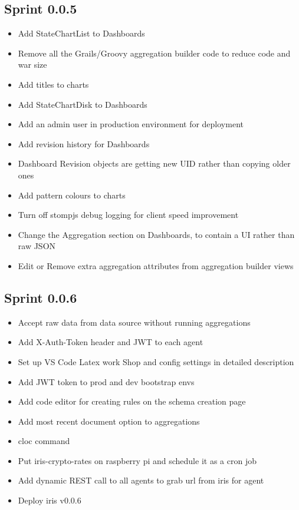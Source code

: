 \documentclass[12pt]{report}
\begin{document}
\subsection*{Sprint 0.0.5}
\begin{itemize}
\item Add StateChartList to Dashboards
\item Remove all the Grails/Groovy aggregation builder code to reduce code and war size
\item Add titles to charts
\item Add StateChartDisk to Dashboards
\item Add an admin user in production environment for deployment
\item Add revision history for Dashboards
\item Dashboard Revision objects are getting new UID rather than copying older ones
\item Add pattern colours to charts
\item Turn off stompjs debug logging for client speed improvement
\item Change the Aggregation section on Dashboards, to contain a UI rather than raw JSON
\item Edit or Remove extra aggregation attributes from aggregation builder views
\end{itemize}
\subsection*{Sprint 0.0.6}
\begin{itemize}
\item Accept raw data from data source without running aggregations
\item Add X-Auth-Token header and JWT to each agent
\item Set up VS Code Latex work Shop and config settings in detailed description
\item Add JWT token to prod and dev bootstrap envs
\item Add code editor for creating rules on the schema creation page
\item Add most recent document option to aggregations
\item cloc command
\item Put iris-crypto-rates on raspberry pi and schedule it as a cron job
\item Add dynamic REST call to all agents to grab url  from iris for agent
\item Deploy iris v0.0.6
\end{itemize}
\end{document}
